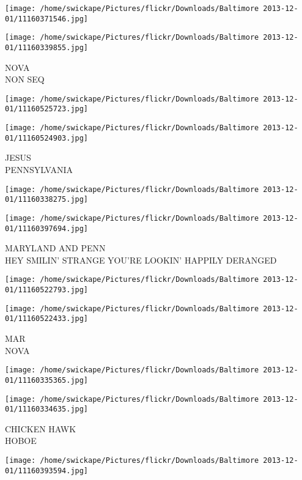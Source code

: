 \documentclass[10pt,letterpaper]{article}
\begin{document}
\texttt{[image: /home/swickape/Pictures/flickr/Downloads/Baltimore 2013-12-01/11160371546.jpg]}

\vspace{0.25in}
\texttt{[image: /home/swickape/Pictures/flickr/Downloads/Baltimore 2013-12-01/11160339855.jpg]}

NOVA\\
NON SEQ
\pagebreak

\texttt{[image: /home/swickape/Pictures/flickr/Downloads/Baltimore 2013-12-01/11160525723.jpg]}

\vspace{0.25in}
\texttt{[image: /home/swickape/Pictures/flickr/Downloads/Baltimore 2013-12-01/11160524903.jpg]}

JESUS\\
PENNSYLVANIA
\pagebreak

\texttt{[image: /home/swickape/Pictures/flickr/Downloads/Baltimore 2013-12-01/11160338275.jpg]}

\vspace{0.25in}
\texttt{[image: /home/swickape/Pictures/flickr/Downloads/Baltimore 2013-12-01/11160397694.jpg]}

MARYLAND AND PENN\\
HEY SMILIN' STRANGE YOU'RE LOOKIN' HAPPILY DERANGED
\pagebreak

\texttt{[image: /home/swickape/Pictures/flickr/Downloads/Baltimore 2013-12-01/11160522793.jpg]}

\vspace{0.25in}
\texttt{[image: /home/swickape/Pictures/flickr/Downloads/Baltimore 2013-12-01/11160522433.jpg]}

MAR\\
NOVA
\pagebreak

\texttt{[image: /home/swickape/Pictures/flickr/Downloads/Baltimore 2013-12-01/11160335365.jpg]}

\vspace{0.25in}
\texttt{[image: /home/swickape/Pictures/flickr/Downloads/Baltimore 2013-12-01/11160334635.jpg]}

CHICKEN HAWK\\
HOBOE
\pagebreak

\texttt{[image: /home/swickape/Pictures/flickr/Downloads/Baltimore 2013-12-01/11160393594.jpg]}
\end{document}
